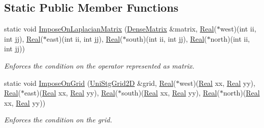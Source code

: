 \subsection*{Static Public Member Functions}
\begin{DoxyCompactItemize}
\item 
static void \hyperlink{classmtk_1_1BCDescriptor2D_a55617743d19ee506f768089716a1c381}{Impose\+On\+Laplacian\+Matrix} (\hyperlink{classmtk_1_1DenseMatrix}{Dense\+Matrix} \&matrix, \hyperlink{group__c01-roots_gac080bbbf5cbb5502c9f00405f894857d}{Real}($\ast$west)(int ii, int jj), \hyperlink{group__c01-roots_gac080bbbf5cbb5502c9f00405f894857d}{Real}($\ast$east)(int ii, int jj), \hyperlink{group__c01-roots_gac080bbbf5cbb5502c9f00405f894857d}{Real}($\ast$south)(int ii, int jj), \hyperlink{group__c01-roots_gac080bbbf5cbb5502c9f00405f894857d}{Real}($\ast$north)(int ii, int jj))
\begin{DoxyCompactList}\small\item\em Enforces the condition on the operator represented as matrix. \end{DoxyCompactList}\item 
static void \hyperlink{classmtk_1_1BCDescriptor2D_aedf1523832776e0fd0224919b2e36fb0}{Impose\+On\+Grid} (\hyperlink{classmtk_1_1UniStgGrid2D}{Uni\+Stg\+Grid2\+D} \&grid, \hyperlink{group__c01-roots_gac080bbbf5cbb5502c9f00405f894857d}{Real}($\ast$west)(\hyperlink{group__c01-roots_gac080bbbf5cbb5502c9f00405f894857d}{Real} xx, \hyperlink{group__c01-roots_gac080bbbf5cbb5502c9f00405f894857d}{Real} yy), \hyperlink{group__c01-roots_gac080bbbf5cbb5502c9f00405f894857d}{Real}($\ast$east)(\hyperlink{group__c01-roots_gac080bbbf5cbb5502c9f00405f894857d}{Real} xx, \hyperlink{group__c01-roots_gac080bbbf5cbb5502c9f00405f894857d}{Real} yy), \hyperlink{group__c01-roots_gac080bbbf5cbb5502c9f00405f894857d}{Real}($\ast$south)(\hyperlink{group__c01-roots_gac080bbbf5cbb5502c9f00405f894857d}{Real} xx, \hyperlink{group__c01-roots_gac080bbbf5cbb5502c9f00405f894857d}{Real} yy), \hyperlink{group__c01-roots_gac080bbbf5cbb5502c9f00405f894857d}{Real}($\ast$north)(\hyperlink{group__c01-roots_gac080bbbf5cbb5502c9f00405f894857d}{Real} xx, \hyperlink{group__c01-roots_gac080bbbf5cbb5502c9f00405f894857d}{Real} yy))
\begin{DoxyCompactList}\small\item\em Enforces the condition on the grid. \end{DoxyCompactList}\end{DoxyCompactItemize}


